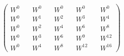 $ \begin{pmatrix} W^0 \quad & W^0 \quad & W^0 \quad & W^0 \quad & W^0  \\[6pt] W^0 \quad & W^1 \quad & W^2 \quad & W^3 \quad & W^4  \\[6pt] W^0 \quad & W^2 \quad & W^4 \quad & W^6 \quad & W^8  \\[6pt] W^0 \quad & W^3 \quad & W^6 \quad & W^9 \quad & W^{12} \\[6pt] W^0 \quad & W^4 \quad & W^8 \quad & W^{12} \quad & W^{16} \end{pmatrix}$
